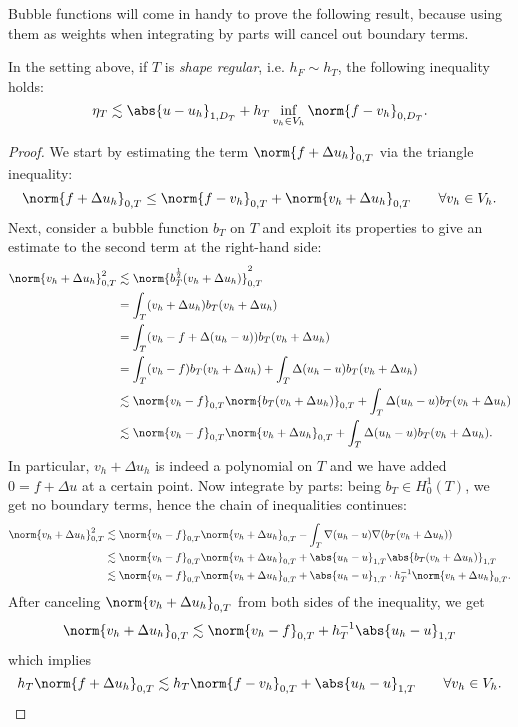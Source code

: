 Bubble functions will come in handy to prove the following result, because using them as weights when integrating by parts will cancel out boundary terms.
\begin{theorem}
    In the setting above, if $T$ is \emph{shape regular}, i.e. $h_F \sim h_T$, the following inequality holds:
    \[
    \eta_T \lesssim \abs{u - u_h}_{1,D_T} + h_T \inf_{v_h \in V_h} \norm{f - v_h}_{0,D_T}.
    \]
\end{theorem}
\begin{proof}
    We start by estimating the term $\norm{f + \Delta u_h}_{0,T}$ via the triangle inequality:
    \[
    \norm{f + \Delta u_h}_{0,T} \le \norm{f - v_h}_{0,T} + \norm{v_h + \Delta u_h}_{0,T} \qquad \forall v_h \in V_h.
    \]
    Next, consider a bubble function $b_T$ on $T$ and exploit its properties to give an estimate to the second term at the right-hand side:
    \begin{align}
        \norm{v_h + \Delta u_h}_{0,T}^2
        & \lesssim \norm{b_T^{\frac{1}{2}} (v_h + \Delta u_h)}_{0,T}^2 \\
        & = \int_T (v_h + \Delta u_h) b_T (v_h + \Delta u_h) \\
        & = \int_T (v_h -f + \Delta (u_h-u)) b_T (v_h + \Delta u_h) \\
        & = \int_T (v_h -f) b_T (v_h + \Delta u_h) + \int_T \Delta(u_h -u) b_T (v_h + \Delta u_h) \\
        & \lesssim \norm{v_h -f}_{0,T} \norm{b_T (v_h + \Delta u_h)}_{0,T} + \int_T \Delta(u_h -u) b_T (v_h + \Delta u_h) \\
        & \lesssim \norm{v_h -f}_{0,T} \norm{v_h + \Delta u_h}_{0,T} + \int_T \Delta(u_h -u) b_T (v_h + \Delta u_h).
    \end{align}
    In particular, $v_h + \Delta u_h$ is indeed a polynomial on $T$ and we have added $0 = f + \Delta u$ at a certain point. Now integrate by parts: being $b_T \in H^1_0(T)$, we get no boundary terms, hence the chain of inequalities continues:
    \begin{align}
        \norm{v_h + \Delta u_h}_{0,T}^2
        & \lesssim \norm{v_h -f}_{0,T} \norm{v_h + \Delta u_h}_{0,T} - \int_T \nabla(u_h -u) \nabla(b_T (v_h + \Delta u_h)) \\
        & \lesssim \norm{v_h -f}_{0,T} \norm{v_h + \Delta u_h}_{0,T} + \abs{u_h-u}_{1,T} \abs{b_T (v_h + \Delta u_h)}_{1,T} \\
        & \lesssim \norm{v_h -f}_{0,T} \norm{v_h + \Delta u_h}_{0,T} + \abs{u_h-u}_{1,T} \cdot h_T^{-1} \norm{v_h + \Delta u_h}_{0,T} .
    \end{align}
    After canceling $\norm{v_h + \Delta u_h}_{0,T}$ from both sides of the inequality, we get
    \[
        \norm{v_h + \Delta u_h}_{0,T}
        \lesssim \norm{v_h -f}_{0,T} + h_T^{-1} \abs{u_h-u}_{1,T}
    \]
    which implies
    \begin{equation}\label{eqn:verfurt1}
    h_T \norm{f + \Delta u_h}_{0,T}
    \lesssim h_T \norm{f - v_h}_{0,T} + \abs{u_h-u}_{1,T} \qquad \forall v_h \in V_h.        
    \end{equation}


\end{proof}
